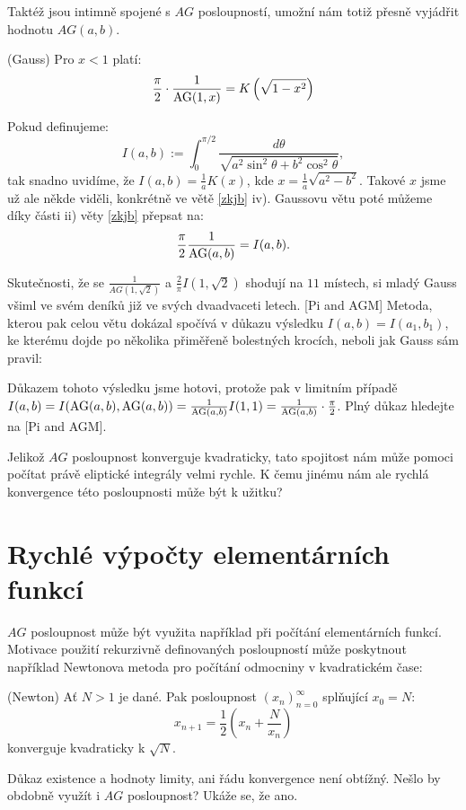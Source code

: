\documentclass[12pt]{report}
\begin{document}
Taktéž jsou intimně spojené s $AG$ posloupností, umožní nám totiž přesně vyjádřit hodnotu $AG(a,b)$.
\begin{veta} (Gauss)
Pro $x<1$ platí:
$$\frac{\pi}{2} \cdot \frac{1}{\operatorname{AG}(1,x)} = K\left(\sqrt{1 - x^2}\right)$$
\end{veta}

Pokud definujeme:
$$I(a,b) := \int_{0}^{\pi/2} \frac{d \theta}{\sqrt{a^2 \sin ^2 \theta + b^2 \cos ^2 \theta}}, $$
tak snadno uvidíme, že $I(a,b) = \frac{1}{a} K(x)$, kde $x =\frac{1}{a} \sqrt{a^2-b^2}$. Takové $x$ jsme už ale někde viděli, konkrétně ve větě \ref{zkjb} iv). Gaussovu větu poté můžeme díky části ii) věty \ref{zkjb} přepsat na:
$$\frac{\pi}{2} \frac{1}{\operatorname{AG}(a,b)} = I(a,b).$$

 Skutečnosti, že se $\frac{1}{AG(1,\sqrt{2})}$ a $\frac{2}{\pi} I(1,\sqrt{2})$ shodují na $11$ místech, si mladý Gauss všiml ve svém deníků již ve svých dvaadvaceti letech. [Pi and AGM] Metoda, kterou pak celou větu dokázal spočívá v důkazu výsledku $I(a,b) = I(a_1,b_1)$, ke kterému dojde po několika přiměřeně bolestných krocích, neboli jak Gauss sám pravil:

\begin{center}
\begin{verse}
\textit{}
\end{verse}
\end{center}
Důkazem tohoto výsledku jsme hotovi, protože pak v limitním případě $I(a,b) = I(\operatorname{AG}(a,b),\operatorname{AG}(a,b)) = \frac{1}{\operatorname{AG}(a,b)} I(1,1) = \frac{1}{\operatorname{AG}(a,b)} \cdot \frac{\pi}{2}$. Plný důkaz hledejte na [Pi and AGM]. 

Jelikož $AG$ posloupnost konverguje kvadraticky, tato spojitost nám může pomoci počítat právě eliptické integrály velmi rychle. K čemu jinému nám ale rychlá konvergence této posloupnosti může být k užitku?
\section{Rychlé výpočty elementárních funkcí}

$AG$ posloupnost může být využita například při počítání elementárních funkcí. Motivace použití rekurzivně definovaných posloupností může poskytnout například Newtonova metoda pro počítání odmocniny v kvadratickém čase:

\begin{veta}(Newton)
Ať $N>1$ je dané. Pak posloupnost $(x_n)_{n=0}^{\infty}$ splňující $x_0 = N$:
$$x_{n+1} = \frac{1}{2} \left( x_n + \frac{N}{x_n}\right)$$
konverguje kvadraticky k $\sqrt{N}$.
\end{veta}
Důkaz existence a hodnoty limity, ani řádu konvergence není obtížný. Nešlo by obdobně využít i $AG$ posloupnost? Ukáže se, že ano.
\end{document}
